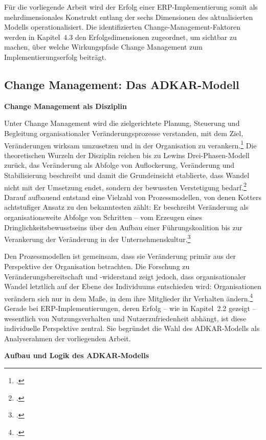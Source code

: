 F\"ur die vorliegende Arbeit wird der Erfolg einer ERP-Implementierung somit als mehrdimensionales Konstrukt entlang der sechs Dimensionen des aktualisierten Modells operationalisiert. Die identifizierten Change-Management-Faktoren werden in Kapitel~4.3 den Erfolgsdimensionen zugeordnet, um sichtbar zu machen, \"uber welche Wirkungspfade Change Management zum Implementierungserfolg beitr\"agt.

\subsection{Change Management: Das ADKAR-Modell}

\textbf{Change Management als Disziplin}

Unter Change Management wird die zielgerichtete Planung, Steuerung und Begleitung organisationaler Ver\"anderungsprozesse verstanden, mit dem Ziel, Ver\"anderungen wirksam umzusetzen und in der Organisation zu verankern.\footcite[Vgl.][S.~369--370]{by2005} Die theoretischen Wurzeln der Disziplin reichen bis zu Lewins Drei-Phasen-Modell zur\"uck, das Ver\"anderung als Abfolge von Auflockerung, Ver\"anderung und Stabilisierung beschreibt und damit die Grundeinsicht etablierte, dass Wandel nicht mit der Umsetzung endet, sondern der bewussten Verstetigung bedarf.\footcite[Vgl.][S.~34--35]{lewin1947} Darauf aufbauend entstand eine Vielzahl von Prozessmodellen, von denen Kotters achtstufiger Ansatz zu den bekanntesten z\"ahlt: Er beschreibt Ver\"anderung als organisationsweite Abfolge von Schritten -- vom Erzeugen eines Dringlichkeitsbewusstseins \"uber den Aufbau einer F\"uhrungskoalition bis zur Verankerung der Ver\"anderung in der Unternehmenskultur.\footcite[Vgl.][S.~20--23]{kotter1996}

Den Prozessmodellen ist gemeinsam, dass sie Ver\"anderung prim\"ar aus der Perspektive der Organisation betrachten. Die Forschung zu Ver\"anderungsbereitschaft und -widerstand zeigt jedoch, dass organisationaler Wandel letztlich auf der Ebene des Individuums entschieden wird: Organisationen ver\"andern sich nur in dem Ma\ss{}e, in dem ihre Mitglieder ihr Verhalten \"andern.\footcites[Vgl.][S.~300--302]{armenakis1999}[][S.~162]{hubbart2023} Gerade bei ERP-Implementierungen, deren Erfolg -- wie in Kapitel~2.2 gezeigt -- wesentlich von Nutzungsverhalten und Nutzerzufriedenheit abh\"angt, ist diese individuelle Perspektive zentral. Sie begr\"undet die Wahl des ADKAR-Modells als Analyserahmen der vorliegenden Arbeit.

\textbf{Aufbau und Logik des ADKAR-Modells}

